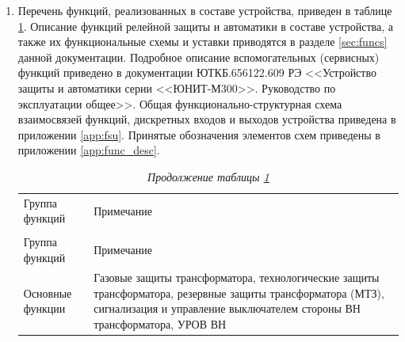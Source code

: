 \begin{enumerate}

\item
Перечень функций, реализованных в составе устройства, приведен в таблице \ref{desc:tbl1}. Описание функций релейной защиты и автоматики в составе устройства, а также их функциональные схемы и уставки приводятся в разделе \ref{sec:funcs} данной документации. Подробное описание вспомогательных (сервисных) функций приведено в документации ЮТКБ.656122.609 РЭ <<Устройство защиты и автоматики серии <<ЮНИТ-М300>>. Руководство по эксплуатации общее>>. Общая функционально-структурная схема взаимосвязей функций, дискретных входов и выходов устройства приведена в приложении \ref{app:fsu}. Принятые обозначения элементов схем приведены в приложении \ref{app:func_desc}.

\small
\setlength{\extrarowheight}{0.05cm} %
\begin{longtable}
{|>{\centering\arraybackslash}m{3.2cm}|>{\centering\arraybackslash}m{13.7cm}|}
\caption{Функции в составе устройства <<ЮНИТ-М300-Т2>>\hfill\vspace{-0.5\baselineskip}}\label{desc:tbl1}\\ 
\hhline{|-|-|}
\rowcolor{gray!30}
Группа функций & Примечание \\ 
\hhline{|-|-|}
\endfirsthead

\caption*{\hspace{3pt}\emph{Продолжение таблицы \ref{desc:tbl1}\hfill\vspace{-0.5\baselineskip}}} \\ %
\hhline{|-|-|}
\rowcolor{gray!30}
Группа функций & Примечание \\ 
\hhline{|-|-|}
\endhead
\hhline{|-|-|}

\endfoot
\endlastfoot

\centering Основные функции & \flushleft\arraybackslash Газовые защиты трансформатора, технологические защиты трансформатора, резервные защиты трансформатора (МТЗ), сигнализация и управление выключателем стороны ВН трансформатора, УРОВ ВН  \\  \hline


\end{longtable}
\end{enumerate}
